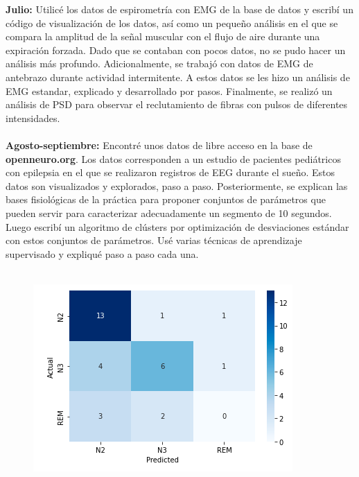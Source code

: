 \documentclass[11pt,letterpaper]{article}
\begin{document}
\begin{flushleft}
\textbf{Julio:}  Utilicé los datos de espirometría con EMG de la base de datos y escribí un código de visualización de los datos, así como un pequeño análisis en el que se compara la amplitud de la señal muscular con el flujo de aire durante una expiración forzada. Dado que se contaban con pocos datos, no se pudo hacer un análisis más profundo. Adicionalmente, se trabajó con datos de EMG de antebrazo durante actividad intermitente. A estos datos se les hizo un análisis de EMG estandar, explicado y desarrollado por pasos. Finalmente, se realizó un análisis de PSD para observar el reclutamiento de fibras con pulsos de diferentes intensidades. \\
\hfill \\
\textbf{Agosto-septiembre:} Encontré unos datos de libre acceso en la base de \textbf{openneuro.org}. Los datos corresponden a un estudio de pacientes pediátricos con epilepsia en el que se realizaron registros de EEG durante el sueño. Estos datos son visualizados y explorados, paso a paso. Posteriormente, se explican las bases fisiológicas de la práctica para proponer conjuntos de parámetros que pueden servir para caracterizar adecuadamente un segmento de 10 segundos. Luego escribí un algoritmo de clústers por optimización de desviaciones estándar con estos conjuntos de parámetros. Usé varias técnicas de aprendizaje supervisado y expliqué paso a paso cada una. \\
\hfill \\
\begin{figure}[H]
\centering
\begin{minipage}{.48\linewidth}
\vspace{2cm}
	\includegraphics[width=0.9\linewidth]{confusion.png}
	\vspace{1.2cm}

\end{minipage}
\end{figure}
\end{flushleft}
\end{document}
